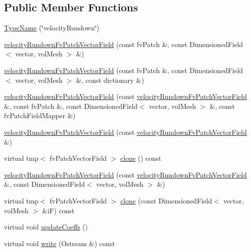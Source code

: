 \subsection*{Public Member Functions}
\begin{DoxyCompactItemize}
\item 
\hyperlink{classFoam_1_1velocityRundownFvPatchVectorField_a3ce6e10f2c8937deb9620e13f6b482d9}{Type\+Name} (\char`\"{}velocity\+Rundown\char`\"{})
\item 
\hyperlink{classFoam_1_1velocityRundownFvPatchVectorField_ade53e65c607c971d8c9ce0cc3e360ac5}{velocity\+Rundown\+Fv\+Patch\+Vector\+Field} (const fv\+Patch \&, const Dimensioned\+Field$<$ vector, vol\+Mesh $>$ \&)
\item 
\hyperlink{classFoam_1_1velocityRundownFvPatchVectorField_a22e2fa2ac030e42a60376f9dac0c14ab}{velocity\+Rundown\+Fv\+Patch\+Vector\+Field} (const fv\+Patch \&, const Dimensioned\+Field$<$ vector, vol\+Mesh $>$ \&, const dictionary \&)
\item 
\hyperlink{classFoam_1_1velocityRundownFvPatchVectorField_aab54816831d61e2d709fe10989672b24}{velocity\+Rundown\+Fv\+Patch\+Vector\+Field} (const \hyperlink{classFoam_1_1velocityRundownFvPatchVectorField}{velocity\+Rundown\+Fv\+Patch\+Vector\+Field} \&, const fv\+Patch \&, const Dimensioned\+Field$<$ vector, vol\+Mesh $>$ \&, const fv\+Patch\+Field\+Mapper \&)
\item 
\hyperlink{classFoam_1_1velocityRundownFvPatchVectorField_a7316bb2fed340a0f7f7a67bb7230ce79}{velocity\+Rundown\+Fv\+Patch\+Vector\+Field} (const \hyperlink{classFoam_1_1velocityRundownFvPatchVectorField}{velocity\+Rundown\+Fv\+Patch\+Vector\+Field} \&)
\item 
virtual tmp$<$ fv\+Patch\+Vector\+Field $>$ \hyperlink{classFoam_1_1velocityRundownFvPatchVectorField_af0f4bc68c73acc08f11adb3a8957d875}{clone} () const
\item 
\hyperlink{classFoam_1_1velocityRundownFvPatchVectorField_ab276d7a9c224534b6a525c9b962c5927}{velocity\+Rundown\+Fv\+Patch\+Vector\+Field} (const \hyperlink{classFoam_1_1velocityRundownFvPatchVectorField}{velocity\+Rundown\+Fv\+Patch\+Vector\+Field} \&, const Dimensioned\+Field$<$ vector, vol\+Mesh $>$ \&)
\item 
virtual tmp$<$ fv\+Patch\+Vector\+Field $>$ \hyperlink{classFoam_1_1velocityRundownFvPatchVectorField_a089f8c8dc7161cb741c2b911efc67d76}{clone} (const Dimensioned\+Field$<$ vector, vol\+Mesh $>$ \&iF) const
\item 
virtual void \hyperlink{classFoam_1_1velocityRundownFvPatchVectorField_a7e24eafac629d3733181cd942d4c902f}{update\+Coeffs} ()
\item 
virtual void \hyperlink{classFoam_1_1velocityRundownFvPatchVectorField_a293fdfec8bdfbd5c3913ab4c9f3454ff}{write} (Ostream \&) const
\end{DoxyCompactItemize}


